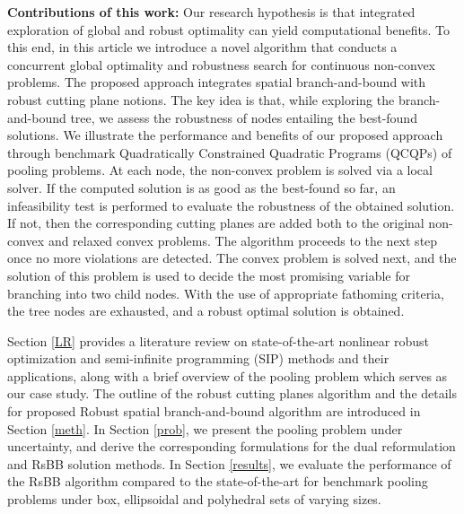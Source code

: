 \documentclass[sn-mathphys-num]{sn-jnl}
\begin{document}
\textbf{Contributions of this work:} Our research hypothesis is that integrated exploration of global and robust optimality can yield computational benefits. To this end, in this article we introduce a novel algorithm that conducts a concurrent global optimality and robustness search for continuous non-convex problems. The proposed approach integrates spatial branch-and-bound with robust cutting plane notions. The key idea is that, while exploring the branch-and-bound tree, we assess the robustness of nodes entailing the best-found solutions. We illustrate the performance and benefits of our proposed approach through benchmark Quadratically Constrained Quadratic Programs (QCQPs) of pooling problems. At each node, the non-convex problem is solved via a local solver. If the computed solution is as good as the best-found so far, an infeasibility test is performed to evaluate the robustness of the obtained solution. If not, then the corresponding cutting planes are added both to the original non-convex and relaxed convex problems. The algorithm proceeds to the next step once no more violations are detected. The convex problem is solved next, and the solution of this problem is used to decide the most promising variable for branching into two child nodes. With the use of appropriate fathoming criteria, the tree nodes are exhausted, and a robust optimal solution is obtained. 

Section \ref{LR} provides a literature review on state-of-the-art nonlinear robust optimization and semi-infinite programming (SIP) methods and their applications, along with a brief overview of the pooling problem which serves as our case study. The outline of the robust cutting planes algorithm and the details for proposed Robust spatial branch-and-bound algorithm are introduced in Section \ref{meth}. In Section \ref{prob}, we present the pooling problem under uncertainty, and derive the corresponding formulations for the dual reformulation and RsBB solution methods. In Section \ref{results}, we evaluate the performance of the RsBB algorithm compared to the state-of-the-art for benchmark pooling problems under box, ellipsoidal and polyhedral sets of varying sizes.
\end{document}
